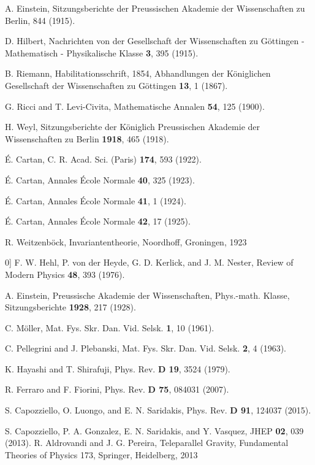\documentclass[aps,superscriptaddress, showpacs,preprintnumbers, superscriptaddress, nofootinbibt,twocolumn]{revtex4}
\begin{document}
\begin{thebibliography}{99}

 A. Einstein, Sitzungsberichte der Preussischen Akademie der Wissenschaften zu Berlin, 844 (1915).

 D. Hilbert,  Nachrichten von der Gesellschaft der Wissenschaften zu G\"{o}ttingen - Mathematisch - Physikalische Klasse {\bf 3}, 395 (1915).

 B. Riemann,  Habilitationsschrift, 1854, Abhandlungen der K\"{o}niglichen Gesellschaft der Wissenschaften zu
G\"{o}ttingen {\bf 13}, 1 (1867).

 G. Ricci and T. Levi-Civita,  Mathematische Annalen {\bf 54},  125 (1900).

  H. Weyl, Sitzungsberichte der K\"{o}niglich Preussischen
Akademie der Wissenschaften zu Berlin {\bf 1918}, 465 (1918).

 \'{E}. Cartan, C. R. Acad. Sci. (Paris) {\bf 174}, 593 (1922).

  \'{E}. Cartan, Annales \'{E}cole  Normale {\bf  40}, 325 (1923).

 \'{E}. Cartan, Annales  \'{E}cole Normale {\bf  41}, 1 (1924).

 \'{E}. Cartan, Annales \'{E}cole Normale {\bf 42}, 17 (1925).

 R. Weitzenb\"{o}ck, Invariantentheorie, Noordhoff, Groningen, 1923

 0] F. W. Hehl, P. von der Heyde, G. D. Kerlick, and J. M.
Nester, Review of Modern Physics {\bf 48}, 393 (1976).

 A. Einstein, Preussische Akademie der Wissenschaften,
Phys.-math. Klasse, Sitzungsberichte {\bf 1928}, 217 (1928).

 C. M\"{o}ller, Mat. Fys. Skr. Dan. Vid. Selsk. {\bf 1}, 10 (1961).

 C. Pellegrini and J. Plebanski, Mat. Fys. Skr. Dan. Vid.
Selsk. {\bf 2}, 4 (1963).

 K. Hayashi and T. Shirafuji, Phys. Rev. {\bf D 19}, 3524
(1979).

  R. Ferraro and F. Fiorini,  Phys. Rev. {\bf D 75}, 084031 (2007).

  S. Capozziello, O. Luongo, and E. N. Saridakis,  Phys. Rev. {\bf D 91}, 124037 (2015).

  S. Capozziello, P. A. Gonzalez, E. N. Saridakis, and Y. Vasquez,  JHEP {\bf 02}, 039 (2013).
 R. Aldrovandi and J. G. Pereira, Teleparallel Gravity,
Fundamental Theories of Physics 173, Springer, Heidelberg, 2013


\end{thebibliography}
\end{document}
